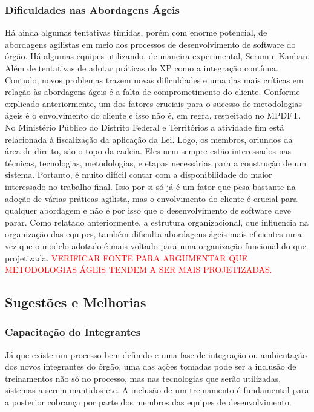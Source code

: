 \documentclass[
	article,			%
	11pt,				%
	oneside,			%
	a4paper,			%
	english,			%
	brazil,				%
	sumario=tradicional
	]{abntex2}
\begin{document}
\subsubsection{Dificuldades nas Abordagens Ágeis}

Há ainda algumas tentativas tímidas, porém com enorme potencial, de abordagens
agilistas em meio aos processos de desenvolvimento de software do órgão. Há
algumas equipes utilizando, de maneira experimental, Scrum e Kanban. Além de
tentativas de adotar práticas do XP como a integração contínua. Contudo, novos
problemas trazem novas dificuldades e uma das mais críticas em relação às
abordagens ágeis é a falta de comprometimento do cliente. Conforme explicado
anteriormente, um dos fatores cruciais para o sucesso de metodologias ágeis é o
envolvimento do cliente e isso não é, em regra, respeitado no MPDFT. No
Ministério Público do Distrito Federal e Territórios a atividade fim está
relacionada à fiscalização da aplicação da Lei. Logo, os membros, oriundos da
área de direito, são o topo da cadeia. Eles nem sempre estão interessados nas
técnicas, tecnologias, metodologias, e etapas necessárias para a construção de
um sistema. Portanto, é muito difícil contar com a disponibilidade do maior
interessado no trabalho final. Isso por si só já é um fator que pesa bastante na
adoção de várias práticas agilista, mas o envolvimento do cliente é crucial para
qualquer abordagem e não é por isso que o desenvolvimento de software deve
parar. Como relatado anteriormente, a estrutura organizacional, que influencia
na organização das equipes, também dificulta abordagens ágeis mais eficientes
uma vez que o modelo adotado é mais voltado para uma organização funcional do
que projetizada. \textcolor{red}{VERIFICAR FONTE PARA ARGUMENTAR QUE
METODOLOGIAS ÁGEIS TENDEM A SER MAIS PROJETIZADAS.}

\subsection{Sugestões e Melhorias}

\subsubsection{Capacitação do Integrantes}

Já que existe um processo bem definido e uma fase de integração ou ambientação
dos novos integrantes do órgão, uma das ações tomadas pode ser a inclusão de
treinamentos não só no processo, mas nas tecnologias que serão utilizadas,
sistemas a serem mantidos etc. A inclusão de um treinamento é fundamental para a
posterior cobrança por parte dos membros das equipes de desenvolvimento.
\end{document}
